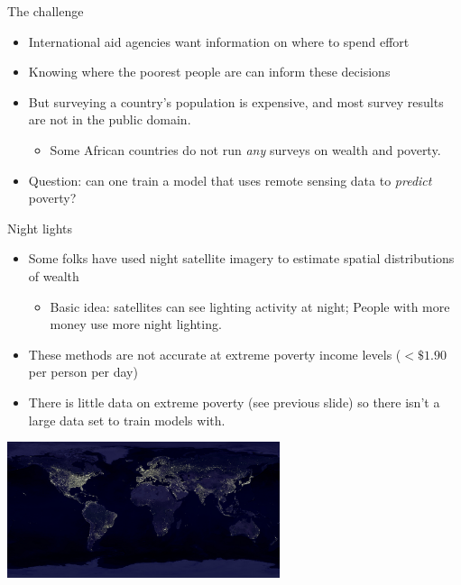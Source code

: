\documentclass[mathserif, aspectratio=169]{beamer}
\begin{document}
\begin{frame}{The challenge}

\begin{itemize}
\item International aid agencies want information on where to spend effort
\item Knowing where the poorest people are can inform these decisions
\item But surveying a country's population is expensive, and most survey results are not in the public domain.  
\begin{itemize}
\item Some African countries do not run \textit{any} surveys on wealth and poverty. 
\end{itemize}
\item Question: can one train a model that uses remote sensing data to \textit{predict} poverty?
\end{itemize}

\end{frame}

\begin{frame}{Night lights}

	\begin{itemize}
		\item Some folks have used night satellite imagery to estimate spatial distributions of wealth
			\begin{itemize}
				\item Basic idea: satellites can see lighting activity at night; People with more money use more night lighting.  
			\end{itemize}
		\item These methods are not accurate at extreme poverty income levels ($<\$1.90$ per person per day)
		\item There is little data on extreme poverty (see previous slide) so there isn't a large data set to train models with.
	\end{itemize}
	\begin{center}
		\includegraphics[width=0.6\textwidth]{earth_lights_lrg}
	\end{center}
\end{frame}
\end{document}
